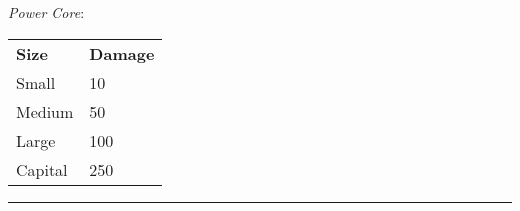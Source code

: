 \documentclass[8pt,landscape,a4paper]{article}
\begin{document}
\begin{multicols}{4}
\emph{Power Core}:

\begin{center}\begin{tabular}{ll}
\textbf{Size} & \textbf{Damage} \\
Small         & 10              \\
Medium        & 50              \\
Large         & 100             \\
Capital       & 250
\end{tabular}
\end{center}


\rule{0.3\linewidth}{0.25pt}
\scriptsize


\end{multicols}
\end{document}
